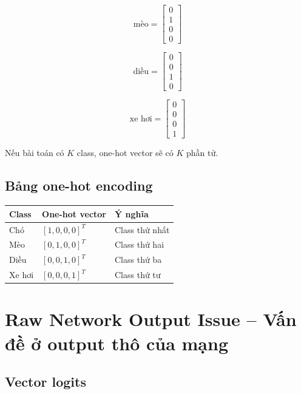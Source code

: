 \[
    \text{mèo}
    =
    \begin{bmatrix}
    0\\1\\0\\0
    \end{bmatrix}
\]

\[
    \text{diều}
    =
    \begin{bmatrix}
    0\\0\\1\\0
    \end{bmatrix}
\]

\[
    \text{xe hơi}
    =
    \begin{bmatrix}
    0\\0\\0\\1
    \end{bmatrix}
\]

\begin{ghinho}
Nếu bài toán có $K$ class, one-hot vector sẽ có $K$ phần tử.
\end{ghinho}

\subsection{Bảng one-hot encoding}

\begin{center}
\begin{tabular}{lll}
\toprule
Class & One-hot vector & Ý nghĩa \\
\midrule
Chó & $[1,0,0,0]^T$ & Class thứ nhất \\
Mèo & $[0,1,0,0]^T$ & Class thứ hai \\
Diều & $[0,0,1,0]^T$ & Class thứ ba \\
Xe hơi & $[0,0,0,1]^T$ & Class thứ tư \\
\bottomrule
\end{tabular}
\end{center}

\section{Raw Network Output Issue -- Vấn đề ở output thô của mạng}

\subsection{Vector logits}

